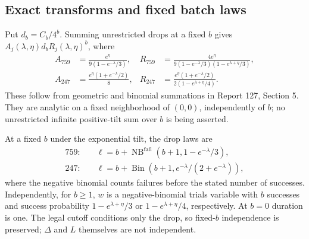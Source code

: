 \documentclass[11pt,letterpaper]{article}
\theoremstyle{remark}\newtheorem{remark}[theorem]{Remark}
\numberwithin{equation}{section}
\DeclareMathOperator{\NB}{NB}\DeclareMathOperator{\Bin}{Bin}
\begin{document}
\subsection{Exact transforms and fixed batch laws}
Put $d_b=C_b/4^b$. Summing unrestricted drops at a fixed $b$ gives
$A_j(\lambda,\eta)d_bR_j(\lambda,\eta)^b$, where
\begin{align}
 A_{759}&=\frac{e^\eta}{9(1-e^{-\lambda}/3)},&
 R_{759}&=\frac{4e^\eta}{9(1-e^{-\lambda}/3)(1-e^{\lambda+\eta}/3)},
 \label{ivd:ll:eq:transform759}\\
 A_{247}&=\frac{e^\eta(1+e^{-\lambda}/2)}8,&
 R_{247}&=\frac{e^\eta(1+e^{-\lambda}/2)}{2(1-e^{\lambda+\eta}/4)}.
 \label{ivd:ll:eq:transform247}
\end{align}
These follow from geometric and binomial summations in
Report 127, Section 5. They are analytic on a fixed neighborhood of
$(0,0)$, independently of $b$; no unrestricted infinite positive-tilt
sum over $b$ is being asserted.

At a fixed $b$ under the exponential tilt, the drop laws are
\begin{align}
 759:\quad&\ell=b+\NB^{\mathrm{fail}}(b+1,1-e^{-\lambda}/3),\\
 247:\quad&\ell=b+\Bin(b+1,e^{-\lambda}/(2+e^{-\lambda})),
 \label{ivd:ll:eq:drop}
\end{align}
where the negative binomial counts failures before the stated number
of successes. Independently, for $b\ge1$, $w$ is a negative-binomial
trials variable with $b$ successes and success probability
$1-e^{\lambda+\eta}/3$ or $1-e^{\lambda+\eta}/4$, respectively.
At $b=0$ duration is one. The legal cutoff conditions only the drop,
so fixed-$b$ independence is preserved; $\Delta$ and $L$ themselves
are not independent.
\end{document}
